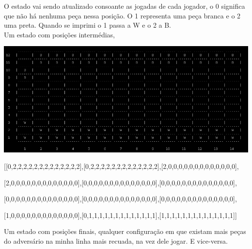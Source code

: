 \documentclass[a4paper]{article}
\begin{document}
O estado vai sendo atualizado consoante as jogadas de cada jogador, o 0 significa que não há nenhuma peça nessa posição. O 1 representa uma peça branca e o 2 uma preta. Quando se imprimi o 1 passa a W e o 2 a B.
\\\linebreak
Um estado com posições intermédias,
\begin{center}
  \includegraphics[scale=0.45]{intermedio.png}

[[0,2,2,2,2,2,2,2,2,2,2,2,2,2],[0,2,2,2,2,2,2,2,2,2,2,2,2,2],[2,0,0,0,0,0,0,0,0,0,0,0,0,0],

  [2,0,0,0,0,0,0,0,0,0,0,0,0,0],[0,0,0,0,0,0,0,0,0,0,0,0,0,0],[0,0,0,0,0,0,0,0,0,0,0,0,0,0],

  [0,0,0,0,0,0,0,0,0,0,0,0,0,0],[0,0,0,0,0,0,0,0,0,0,0,0,0,0],[0,0,0,0,0,0,0,0,0,0,0,0,0,0],

[1,0,0,0,0,0,0,0,0,0,0,0,0,0],[0,1,1,1,1,1,1,1,1,1,1,1,1,1],[1,1,1,1,1,1,1,1,1,1,1,1,1,1]]
\end{center}
Um estado com posições finais, qualquer configuração em que existam mais peças do adversário na minha linha mais recuada, na vez dele jogar. E vice-versa.
\end{document}
